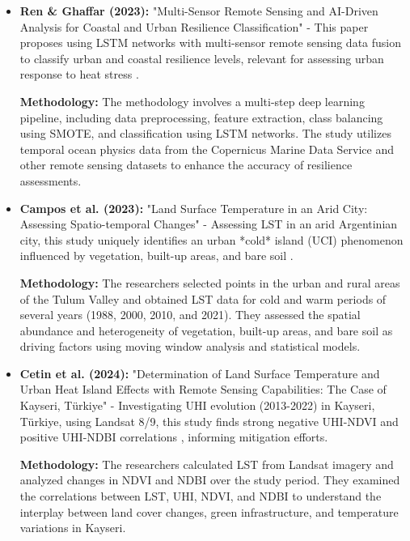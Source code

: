 \documentclass{article}
\begin{document}
\begin{itemize}
    \item \textbf{Ren \& Ghaffar (2023):} "{Multi-Sensor Remote Sensing and AI-Driven Analysis for Coastal and Urban Resilience Classification}" - This paper proposes using LSTM networks with multi-sensor remote sensing data fusion to classify urban and coastal resilience levels, relevant for assessing urban response to heat stress \parencite{Ren_2023}.

    \textbf{Methodology:} The methodology involves a multi-step deep learning pipeline, including data preprocessing, feature extraction, class balancing using SMOTE, and classification using LSTM networks. The study utilizes temporal ocean physics data from the Copernicus Marine Data Service and other remote sensing datasets to enhance the accuracy of resilience assessments.

    \vspace{0.3cm}
    
    \item \textbf{Campos et al. (2023):} "{Land Surface Temperature in an Arid City: Assessing Spatio-temporal Changes}" - Assessing LST in an arid Argentinian city, this study uniquely identifies an urban *cold* island (UCI) phenomenon influenced by vegetation, built-up areas, and bare soil \parencite{Campos_2023}.

    \textbf{Methodology:} The researchers selected points in the urban and rural areas of the Tulum Valley and obtained LST data for cold and warm periods of several years (1988, 2000, 2010, and 2021). They assessed the spatial abundance and heterogeneity of vegetation, built-up areas, and bare soil as driving factors using moving window analysis and statistical models.

     \vspace{0.3cm}    

    \item \textbf{Cetin et al. (2024):} "{Determination of Land Surface Temperature and Urban Heat Island Effects with Remote Sensing Capabilities: The Case of Kayseri, Türkiye}" - Investigating UHI evolution (2013-2022) in Kayseri, Türkiye, using Landsat 8/9, this study finds strong negative UHI-NDVI and positive UHI-NDBI correlations \parencite{Cetin_2024}, informing mitigation efforts.

    \textbf{Methodology:} The researchers calculated LST from Landsat imagery and analyzed changes in NDVI and NDBI over the study period. They examined the correlations between LST, UHI, NDVI, and NDBI to understand the interplay between land cover changes, green infrastructure, and temperature variations in Kayseri.


\end{itemize}
\end{document}
